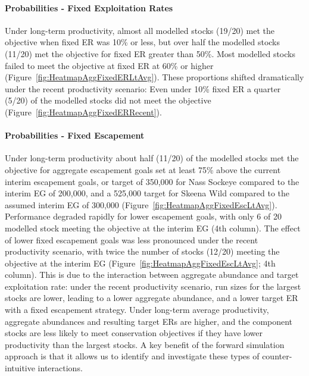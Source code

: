 \documentclass[french,11pt]{book}
\begin{document}
\paragraph{Probabilities - Fixed Exploitation Rates}\label{probabilities---fixed-exploitation-rates}

Under long-term productivity, almost all modelled stocks (19/20) met the objective when fixed ER was 10\% or less, but over half the modelled stocks (11/20) met the objective for fixed ER greater than 50\%. Most modelled stocks failed to meet the objective at fixed ER at 60\% or higher (Figure~\ref{fig:HeatmapAggFixedERLtAvg}). These proportions shifted dramatically under the recent productivity scenario: Even under 10\% fixed ER a quarter (5/20) of the modelled stocks did not meet the objective (Figure~\ref{fig:HeatmapAggFixedERRecent}).

\paragraph{Probabilities - Fixed Escapement}\label{probabilities---fixed-escapement}

Under long-term productivity about half (11/20) of the modelled stocks met the objective for aggregate escapement goals set at least 75\% above the current interim escapement goals, or target of 350,000 for Nass Sockeye compared to the interim EG of 200,000, and a 525,000 target for Skeena Wild compared to the assumed interim EG of 300,000 (Figure~\ref{fig:HeatmapAggFixedEscLtAvg}). Performance degraded rapidly for lower escapement goals, with only 6 of 20 modelled stock meeting the objective at the interim EG (4th column). The effect of lower fixed escapement goals was less pronounced under the recent productivity scenario, with twice the number of stocks (12/20) meeting the objective at the interim EG (Figure~\ref{fig:HeatmapAggFixedEscLtAvg}; 4th column). This is due to the interaction between aggregate abundance and target exploitation rate: under the recent productivity scenario, run sizes for the largest stocks are lower, leading to a lower aggregate abundance, and a lower target ER with a fixed escapement strategy. Under long-term average productivity, aggregate abundances and resulting target ERs are higher, and the component stocks are less likely to meet conservation objectives if they have lower productivity than the largest stocks. A key benefit of the forward simulation approach is that it allows us to identify and investigate these types of counter-intuitive interactions.
\end{document}
